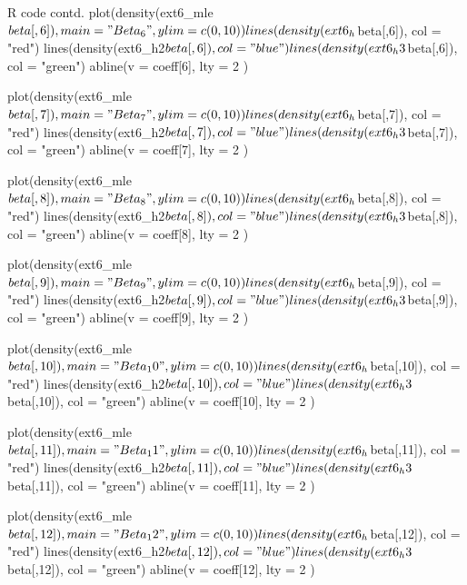 \documentclass{article}
\begin{document}
\begin{sexylisting}{R code contd.}
plot(density(ext6_mle$beta[,6]), main = "Beta_6", ylim = c(0,10))
lines(density(ext6_h$beta[,6]), col = "red")
lines(density(ext6_h2$beta[,6]), col = "blue")
lines(density(ext6_h3$beta[,6]), col = "green")
abline(v = coeff[6], lty = 2 )

plot(density(ext6_mle$beta[,7]), main = "Beta_7", ylim = c(0,10))
lines(density(ext6_h$beta[,7]), col = "red")
lines(density(ext6_h2$beta[,7]), col = "blue")
lines(density(ext6_h3$beta[,7]), col = "green")
abline(v = coeff[7], lty = 2 )

plot(density(ext6_mle$beta[,8]), main = "Beta_8", ylim = c(0,10))
lines(density(ext6_h$beta[,8]), col = "red")
lines(density(ext6_h2$beta[,8]), col = "blue")
lines(density(ext6_h3$beta[,8]), col = "green")
abline(v = coeff[8], lty = 2 )

plot(density(ext6_mle$beta[,9]), main = "Beta_9", ylim = c(0,10))
lines(density(ext6_h$beta[,9]), col = "red")
lines(density(ext6_h2$beta[,9]), col = "blue")
lines(density(ext6_h3$beta[,9]), col = "green")
abline(v = coeff[9], lty = 2 )

plot(density(ext6_mle$beta[,10]), main = "Beta_10", ylim = c(0,10))
lines(density(ext6_h$beta[,10]), col = "red")
lines(density(ext6_h2$beta[,10]), col = "blue")
lines(density(ext6_h3$beta[,10]), col = "green")
abline(v = coeff[10], lty = 2 )

plot(density(ext6_mle$beta[,11]), main = "Beta_11", ylim = c(0,10))
lines(density(ext6_h$beta[,11]), col = "red")
lines(density(ext6_h2$beta[,11]), col = "blue")
lines(density(ext6_h3$beta[,11]), col = "green")
abline(v = coeff[11], lty = 2 )

plot(density(ext6_mle$beta[,12]), main = "Beta_12", ylim = c(0,10))
lines(density(ext6_h$beta[,12]), col = "red")
lines(density(ext6_h2$beta[,12]), col = "blue")
lines(density(ext6_h3$beta[,12]), col = "green")
abline(v = coeff[12], lty = 2 )
\end{sexylisting}
\end{document}
